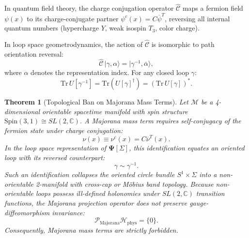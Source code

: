 \documentclass[11pt,a4paper]{article}
\newtheorem{theorem}{Theorem}[section]
\theoremstyle{definition}
\begin{document}
In quantum field theory, the charge conjugation operator $\hat{\mathcal{C}}$ maps a fermion field $\psi(x)$ to its charge-conjugate partner $\psi^c(x) = C \overline{\psi}^T$, reversing all internal quantum numbers (hypercharge $Y$, weak isospin $T_3$, color charge).

In loop space geometrodynamics, the action of $\hat{\mathcal{C}}$ is isomorphic to path orientation reversal:
\begin{equation}
    \hat{\mathcal{C}} \, |\gamma, \alpha\rangle = |\gamma^{-1}, \bar{\alpha}\rangle,
\end{equation}
where $\alpha$ denotes the representation index. For any closed loop $\gamma$:
\begin{equation}
    \mathrm{Tr}\, U[\gamma^{-1}] = \mathrm{Tr}\left( U[\gamma]^\dagger \right) = \left( \mathrm{Tr}\, U[\gamma] \right)^*.
\end{equation}

\begin{theorem}[Topological Ban on Majorana Mass Terms]
Let $\mathcal{M}$ be a 4-dimensional orientable spacetime manifold with spin structure $\mathrm{Spin}(3,1) \cong SL(2, \mathbb{C})$. A Majorana mass term requires self-conjugacy of the fermion state under charge conjugation:
\begin{equation}
    \nu(x) \equiv \nu^c(x) = C \overline{\nu}^T(x).
\end{equation}
In the loop space representation of $\mathbf{\Psi}[\Sigma]$, this identification equates an oriented loop with its reversed counterpart:
\begin{equation}
    \gamma \sim \gamma^{-1}.
\end{equation}
Such an identification collapses the oriented circle bundle $S^1 \times \Sigma$ into a non-orientable 2-manifold with cross-cap or M\"obius band topology. Because non-orientable loops possess ill-defined holonomies under $SL(2, \mathbb{C})$ transition functions, the Majorana projection operator does not preserve gauge-diffeomorphism invariance:
\begin{equation}
    \mathcal{P}_{\mathrm{Majorana}} \mathcal{H}_{\mathrm{phys}} = \{0\}.
\end{equation}
Consequently, Majorana mass terms are strictly forbidden.
\end{theorem}
\end{document}
